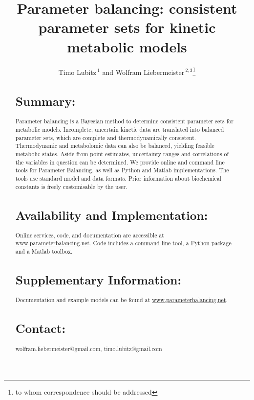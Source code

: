 \documentclass{bioinfo}
\begin{document}

\title[Parameter balancing]{Parameter balancing: consistent parameter sets for kinetic metabolic models}
\author[Lubitz \textit{et~al}]{Timo Lubitz\,$^{1}$ and Wolfram Liebermeister\,$^{2,3}$\footnote{to whom correspondence should be addressed}}
\address{$^{1}$Theoretische  Biophysik, Institut f\"ur  Biologie, Humboldt-Universit\"at zu Berlin, Berlin, Germany \\
$^{2}$INRA, UR1404, MaIAGE, Universit\'e Paris-Saclay, Jouy-en-Josas, France\\
$^{3}$Institut f\"ur Biochemie, Charit\'e -- Universit\"atsmedizin Berlin, Berlin, Germany
}



\maketitle


\begin{abstract}
\section{Summary:}
Parameter balancing is a Bayesian method to determine consistent parameter sets for metabolic models. Incomplete, uncertain kinetic data are translated into balanced parameter sets, which are complete and thermodynamically consistent. Thermodynamic and metabolomic data can also be balanced, yielding feasible metabolic states. Aside from point estimates, uncertainty ranges and correlations of the variables in question can be determined. We provide  online  and command line tools for Parameter Balancing, as well as Python and Matlab implementations.  The tools use standard model and data formats. Prior information about biochemical constants is freely customisable by the user.

\section{Availability and Implementation:}
Online services, code, and documentation are accessible at
\url{www.parameterbalancing.net}. Code includes a command line tool, a
Python package and a Matlab toolbox.

\section{Supplementary Information:}
Documentation and example models can be found at \url{www.parameterbalancing.net}. 


\section{Contact:} wolfram.liebermeister@gmail.com, timo.lubitz@gmail.com
\end{abstract}
\end{document}
